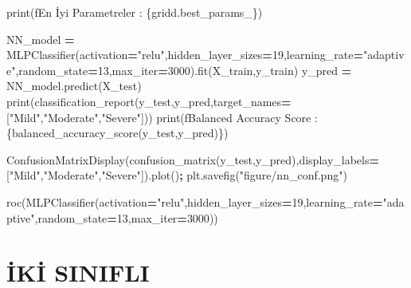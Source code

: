 \documentclass[12pt,twoside]{deuthesis}
\newenvironment{Shaded}{\begin{snugshade}}{\end{snugshade}}
\newcommand{\BuiltInTok}[1]{#1}
\newcommand{\DecValTok}[1]{\textcolor[rgb]{0.00,0.00,0.81}{#1}}
\newcommand{\NormalTok}[1]{#1}
\newcommand{\OperatorTok}[1]{\textcolor[rgb]{0.81,0.36,0.00}{\textbf{#1}}}
\newcommand{\SpecialCharTok}[1]{\textcolor[rgb]{0.00,0.00,0.00}{#1}}
\newcommand{\SpecialStringTok}[1]{\textcolor[rgb]{0.31,0.60,0.02}{#1}}
\newcommand{\StringTok}[1]{\textcolor[rgb]{0.31,0.60,0.02}{#1}}
\begin{document}
\begin{Shaded}
\begin{Highlighting}[]
\BuiltInTok{print}\NormalTok{(}\SpecialStringTok{f\textquotesingle{}En İyi Parametreler : }\SpecialCharTok{\{}\NormalTok{gridd}\SpecialCharTok{.}\NormalTok{best\_params\_}\SpecialCharTok{\}}\SpecialStringTok{\textquotesingle{}}\NormalTok{)}
\end{Highlighting}
\end{Shaded}
\begin{Shaded}
\begin{Highlighting}[]
\NormalTok{NN\_model }\OperatorTok{=}\NormalTok{ MLPClassifier(activation}\OperatorTok{=}\StringTok{"relu"}\NormalTok{,hidden\_layer\_sizes}\OperatorTok{=}\DecValTok{19}\NormalTok{,learning\_rate}\OperatorTok{=}\StringTok{"adaptive"}\NormalTok{,random\_state}\OperatorTok{=}\DecValTok{13}\NormalTok{,max\_iter}\OperatorTok{=}\DecValTok{3000}\NormalTok{).fit(X\_train,y\_train)}
\NormalTok{y\_pred }\OperatorTok{=}\NormalTok{ NN\_model.predict(X\_test)}
\BuiltInTok{print}\NormalTok{(classification\_report(y\_test,y\_pred,target\_names}\OperatorTok{=}\NormalTok{[}\StringTok{"Mild"}\NormalTok{,}\StringTok{"Moderate"}\NormalTok{,}\StringTok{"Severe"}\NormalTok{]))}
\BuiltInTok{print}\NormalTok{(}\SpecialStringTok{f\textquotesingle{}Balanced Accuracy Score : }\SpecialCharTok{\{}\NormalTok{balanced\_accuracy\_score(y\_test,y\_pred)}\SpecialCharTok{\}}\SpecialStringTok{\textquotesingle{}}\NormalTok{)}
\end{Highlighting}
\end{Shaded}
\begin{Shaded}
\begin{Highlighting}[]
\NormalTok{ConfusionMatrixDisplay(confusion\_matrix(y\_test,y\_pred),display\_labels}\OperatorTok{=}\NormalTok{[}\StringTok{"Mild"}\NormalTok{,}\StringTok{"Moderate"}\NormalTok{,}\StringTok{"Severe"}\NormalTok{]).plot()}\OperatorTok{;}
\NormalTok{plt.savefig(}\StringTok{"figure/nn\_conf.png"}\NormalTok{)}
\end{Highlighting}
\end{Shaded}
\begin{Shaded}
\begin{Highlighting}[]
\NormalTok{roc(MLPClassifier(activation}\OperatorTok{=}\StringTok{"relu"}\NormalTok{,hidden\_layer\_sizes}\OperatorTok{=}\DecValTok{19}\NormalTok{,learning\_rate}\OperatorTok{=}\StringTok{"adaptive"}\NormalTok{,random\_state}\OperatorTok{=}\DecValTok{13}\NormalTok{,max\_iter}\OperatorTok{=}\DecValTok{3000}\NormalTok{))}
\end{Highlighting}
\end{Shaded}
\hypertarget{iki-sinifli}{%
\chapter{İKİ SINIFLI}\label{iki-sinifli}}
\end{document}

